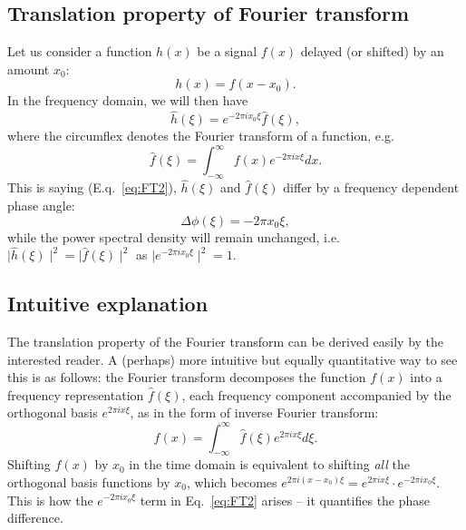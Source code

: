 \subsection{Translation property of Fourier transform}

Let us consider a function $h(x)$ be a signal $f(x)$ delayed (or shifted) by an amount $x_0$:
\begin{equation}
	h(x) = f(x-x_0).
\label{eq:FT1}
\end{equation}
In the frequency domain, we will then have 
\begin{equation}
	\hat{h}(\xi) = e^{-2 \pi ix_0 \xi} \hat{f}(\xi),
\label{eq:FT2}
\end{equation}
where the circumflex denotes the Fourier transform of a function, e.g.
\begin{equation}
	\hat{f}(\xi) = \int_{-\infty}^{\infty} f(x) e^{-2 \pi ix \xi} dx.
\label{eq:FT3}
\end{equation}
This is saying (E.q.~\ref{eq:FT2}), $\hat{h}(\xi)$ and $\hat{f}(\xi)$ differ by a frequency dependent phase angle: 
\begin{equation}
	\Delta \phi(\xi) = -2 \pi x_0 \xi,
\label{eq:PhaseShift}
\end{equation}
while the power spectral density will remain unchanged, i.e. $\mid \hat{h}(\xi)\mid ^2 = \mid\hat{f}(\xi)\mid^2$ as $\mid e^{-2 \pi ix_0 \xi}\mid ^2 = 1$.

\subsection{Intuitive explanation}

The translation property of the Fourier transform can be derived easily by the interested reader. A (perhaps) more intuitive but equally quantitative way to see this is as follows: the Fourier transform decomposes the function $f(x)$ into a frequency representation $\hat{f}(\xi)$, each frequency component accompanied by the orthogonal basis $e^{2 \pi ix \xi}$, as in the form of inverse Fourier transform: 
\begin{equation}
	f(x) = \int_{-\infty}^{\infty} \hat{f}(\xi) e^{2 \pi ix \xi} d\xi. 
\end{equation}
Shifting $f(x)$ by $x_0$ in the time domain is equivalent to shifting \textit{all} the orthogonal basis functions by $x_0$, which becomes $e^{2 \pi i(x-x_0) \xi} = e^{2 \pi i x \xi} \cdot e^{-2 \pi ix_0 \xi}$. This is how the $e^{-2 \pi ix_0 \xi}$ term in Eq.~\ref{eq:FT2} arises -- it quantifies the phase difference. 

